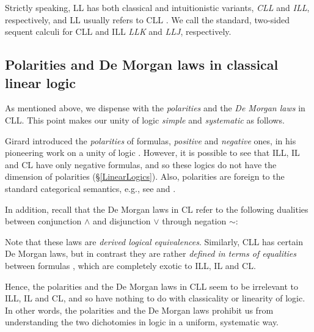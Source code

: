 \documentclass[a4paper]{article}
\theoremstyle{definition}
\theoremstyle{theorem}
\theoremstyle{remark}
\begin{document}
Strictly speaking, LL has both classical and intuitionistic variants, \emph{CLL} and \emph{ILL}, respectively, and LL usually refers to CLL \cite{abramsky1993computational,mellies2009categorical}.
We call the standard, two-sided sequent calculi for CLL and ILL \cite{girard1987linear,abramsky1993computational,troelstra2000basic,mellies2009categorical} \emph{\textsf{LLK}} and \emph{\textsf{LLJ}}, respectively.
\fi







\subsection{Polarities and De Morgan laws in classical linear logic}
\label{PolaritiesAndConcurrencyInLogicAndGames}
As mentioned above, we dispense with the \emph{polarities} and the \emph{De Morgan laws} in CLL.
This point makes our unity of logic \emph{simple} and \emph{systematic} as follows.

Girard introduced the \emph{polarities} of formulas, \emph{positive} and \emph{negative} ones, in his pioneering work on a unity of logic \cite{girard1993unity}.
However, it is possible to see that ILL, IL and CL have only negative formulas, and so these logics do not have the dimension of polarities (\S\ref{LinearLogics}).
Also, polarities are foreign to the standard categorical semantics, e.g., see \cite[p.~256]{girard2011blind} and \cite[Remark~34 on p.~19]{laurent2002polarized}.

In addition, recall that the De Morgan laws in CL refer to the following dualities between conjunction $\wedge$ and disjunction $\vee$ through negation $\mathbin{\sim}$:
Note that these laws are \emph{derived logical equivalences}.
Similarly, CLL has certain De Morgan laws, but in contrast they are rather \emph{defined in terms of equalities} between formulas \cite{girard1987linear}, which are completely exotic to ILL, IL and CL.

Hence, the polarities and the De Morgan laws in CLL seem to be irrelevant to ILL, IL and CL, and so have nothing to do with classicality or linearity of logic.
In other words, the polarities and the De Morgan laws prohibit us from understanding the two dichotomies in logic in a uniform, systematic way.
\end{document}

